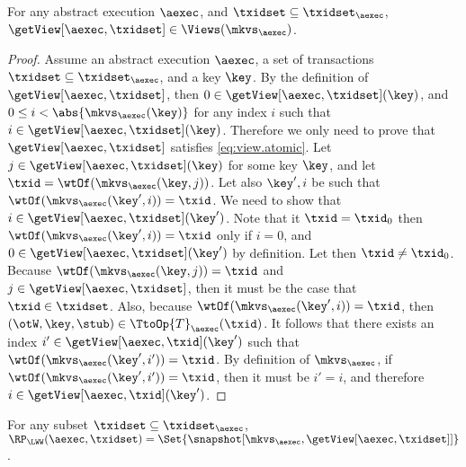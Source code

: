 \begin{proposition}
\label{prop:getview.valid}
For any abstract execution \(\aexec\), and \(\txidset \subseteq \txidset_{\aexec}\), 
\(\getView[\aexec, \txidset] \in \Views(\mkvs_{\aexec})\).
\end{proposition}
\begin{proof}
Assume an abstract execution \(\aexec\), a set of transactions \(\txidset \subseteq \txidset_{\aexec}\), and a key \( \key \).
By the definition of \(\getView[\aexec, \txidset]\), 
then \(0 \in \getView[\aexec, \txidset](\key)\), and 
\(0 \leq i < \abs{ \mkvs_{\aexec}(\key) }\) for any index \( i \) such that \(i \in \getView[\aexec, \txidset](\key)\).
Therefore we only need to prove that \(\getView[\aexec, \txidset]\) satisfies \eqref{eq:view.atomic}.
Let \(j \in \getView[\aexec, \txidset](\key)\) for some key \(\key\), and let \(\txid = 
\wtOf(\mkvs_{\aexec}(\key, j))\). Let also \(\key', i\) be such that 
\(\wtOf(\mkvs_{\aexec}(\key', i)) = \txid\). We need to show that 
\(i \in \getView[\aexec, \txidset](\key')\). Note that it \(\txid = \txid_{0}\) 
then \(\wtOf(\mkvs_{\aexec}(\key', i)) = \txid\) only if \(i = 0\), and 
\(0 \in \getView[\aexec, \txidset](\key')\) by definition. 
Let then \(\txid \neq \txid_{0}\). Because \(\wtOf(\mkvs_{\aexec}(\key, j)) = \txid\) 
and \(j \in \getView[\aexec, \txidset]\), then it must be the case that \(\txid \in \txidset\). 
Also, because \(\wtOf(\mkvs_{\aexec}(\key', i)) = \txid\), then \((\otW, \key, \stub) \in 
\TtoOp{T}_{\aexec}(\txid)\). It follows that there exists an index \(i' \in \getView[\aexec, \txid](\key')\) 
such that \(\wtOf(\mkvs_{\aexec}(\key', i')) = \txid\). By definition of 
\(\mkvs_{\aexec}\), if \(\wtOf(\mkvs_{\aexec}(\key', i')) = \txid\), then it must 
be \(i' = i\), and therefore \(i \in \getView[\aexec, \txid](\key')\).
\end{proof}


\begin{proposition}
\label{prop:compatible.aexec2kv}
For any subset \(\txidset \subseteq \txidset_{\aexec}\), \(\RP_{\LWW}(\aexec, \txidset) = \Set{\snapshot[\mkvs_{\aexec}, \getView[\aexec, \txidset]]}\).
\end{proposition}

